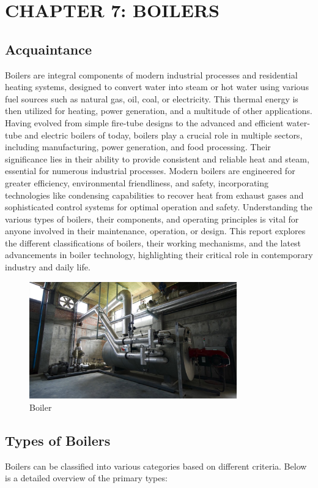 \section{CHAPTER 7: BOILERS}
\subsection{Acquaintance}
Boilers are integral components of modern industrial processes and residential heating systems, designed to convert water into steam or hot water using various fuel sources such as natural gas, oil, coal, or electricity. This thermal energy is then utilized for heating, power generation, and a multitude of other applications. Having evolved from simple fire-tube designs to the advanced and efficient water-tube and electric boilers of today, boilers play a crucial role in multiple sectors, including manufacturing, power generation, and food processing. Their significance lies in their ability to provide consistent and reliable heat and steam, essential for numerous industrial processes. Modern boilers are engineered for greater efficiency, environmental friendliness, and safety, incorporating technologies like condensing capabilities to recover heat from exhaust gases and sophisticated control systems for optimal operation and safety. Understanding the various types of boilers, their components, and operating principles is vital for anyone involved in their maintenance, operation, or design. This report explores the different classifications of boilers, their working mechanisms, and the latest advancements in boiler technology, highlighting their critical role in contemporary industry and daily life.

\begin{figure}[h]
\centering
\includegraphics[width=0.8\textwidth]{figs/boiler.jpg}
\caption{Boiler}
\label{fig:boiler}
\end{figure}


\subsection{Types of Boilers}
Boilers can be classified into various categories based on different criteria. Below is a detailed overview of the primary types:

